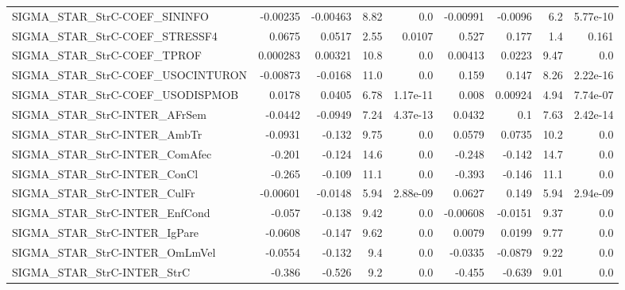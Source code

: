 \begin{tabular}{lrrrrrrrr}
SIGMA\_STAR\_StrC-COEF\_SININFO           &    -0.00235 &     -0.00463 &     8.82 &      0.0 &   -0.00991 &     -0.0096 &          6.2 &      5.77e-10 \\
SIGMA\_STAR\_StrC-COEF\_STRESSF4          &      0.0675 &       0.0517 &     2.55 &   0.0107 &      0.527 &       0.177 &          1.4 &         0.161 \\
SIGMA\_STAR\_StrC-COEF\_TPROF             &    0.000283 &      0.00321 &     10.8 &      0.0 &    0.00413 &      0.0223 &         9.47 &           0.0 \\
SIGMA\_STAR\_StrC-COEF\_USOCINTURON       &    -0.00873 &      -0.0168 &     11.0 &      0.0 &      0.159 &       0.147 &         8.26 &      2.22e-16 \\
SIGMA\_STAR\_StrC-COEF\_USODISPMOB        &      0.0178 &       0.0405 &     6.78 & 1.17e-11 &      0.008 &     0.00924 &         4.94 &      7.74e-07 \\
SIGMA\_STAR\_StrC-INTER\_AFrSem           &     -0.0442 &      -0.0949 &     7.24 & 4.37e-13 &     0.0432 &         0.1 &         7.63 &      2.42e-14 \\
SIGMA\_STAR\_StrC-INTER\_AmbTr            &     -0.0931 &       -0.132 &     9.75 &      0.0 &     0.0579 &      0.0735 &         10.2 &           0.0 \\
SIGMA\_STAR\_StrC-INTER\_ComAfec          &      -0.201 &       -0.124 &     14.6 &      0.0 &     -0.248 &      -0.142 &         14.7 &           0.0 \\
SIGMA\_STAR\_StrC-INTER\_ConCl            &      -0.265 &       -0.109 &     11.1 &      0.0 &     -0.393 &      -0.146 &         11.1 &           0.0 \\
SIGMA\_STAR\_StrC-INTER\_CulFr            &    -0.00601 &      -0.0148 &     5.94 & 2.88e-09 &     0.0627 &       0.149 &         5.94 &      2.94e-09 \\
SIGMA\_STAR\_StrC-INTER\_EnfCond          &      -0.057 &       -0.138 &     9.42 &      0.0 &   -0.00608 &     -0.0151 &         9.37 &           0.0 \\
SIGMA\_STAR\_StrC-INTER\_IgPare           &     -0.0608 &       -0.147 &     9.62 &      0.0 &     0.0079 &      0.0199 &         9.77 &           0.0 \\
SIGMA\_STAR\_StrC-INTER\_OmLmVel          &     -0.0554 &       -0.132 &      9.4 &      0.0 &    -0.0335 &     -0.0879 &         9.22 &           0.0 \\
SIGMA\_STAR\_StrC-INTER\_StrC             &      -0.386 &       -0.526 &      9.2 &      0.0 &     -0.455 &      -0.639 &         9.01 &           0.0 \\

\end{tabular}
